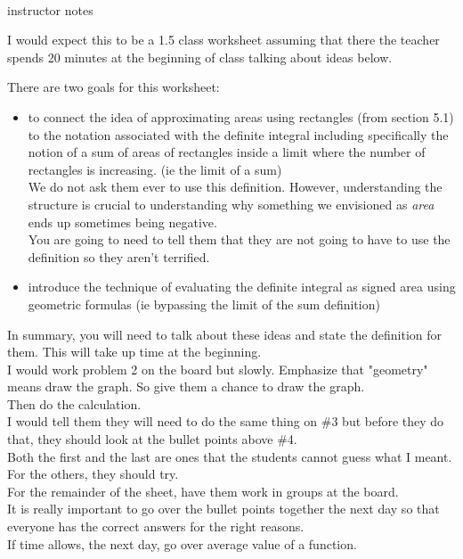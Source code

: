 \documentclass[11pt,fleqn]{article}
\begin{document}
\vspace*{-0.7in}

\begin{center}
  \Large{}\\
  instructor notes
  \end{center}
  
  I would expect this to be a 1.5 class worksheet assuming that there the teacher spends 20 minutes at the beginning of class talking about ideas below.

There are two goals for this worksheet:

\begin{itemize}
\item to connect the idea of approximating areas using rectangles (from section 5.1) to the notation associated with the definite integral including specifically the notion of a sum of areas of rectangles inside a limit where the number of rectangles is increasing. (ie the limit of a sum)\\

We do not ask them ever to use this definition. However, understanding the structure is crucial to understanding why something we envisioned as \emph{area} ends up sometimes being negative.\\

You are going to need to tell them that they are not going to have to use the definition so they aren't terrified.\\

\item introduce the technique of evaluating the definite integral as signed area using geometric formulas (ie bypassing the limit of the sum definition) 
\end{itemize}

In summary, you will need to talk about these ideas and state the definition for them. This will take up time at the beginning.\\

I would work problem 2 on the board but slowly. Emphasize that "geometry" means draw the graph. So give them a chance to draw the graph. \\

Then do the calculation.\\

I would tell them they will need to do the same thing on \#3 but before they do that, they should look at the bullet points above \#4.\\

Both the first and the last are ones that the students cannot guess what I meant. For the others, they should try.\\

For the remainder of the sheet, have them work in groups at the board.\\

It is really important to go over the bullet points together the next day so that everyone has the correct answers for the right reasons.\\

If time allows, the next day, go over average value of a function.\\
\end{document}

